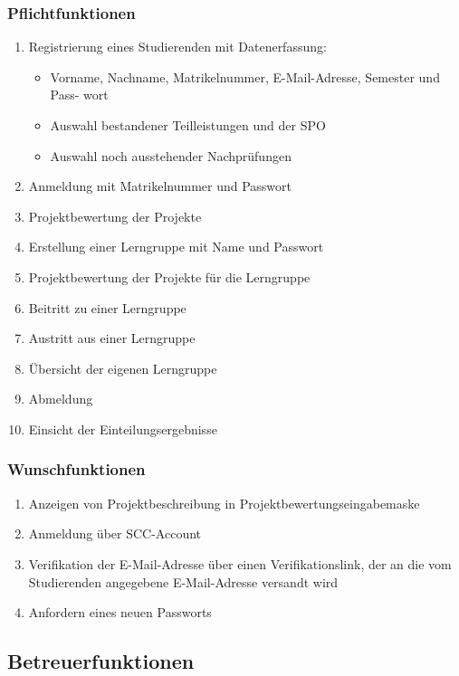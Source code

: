 \documentclass[parskip=full]{scrartcl}
\newcommand{\swtLabel}[1]{\textbf{/#1\arabic*0/}}
\begin{document}
\subsubsection{Pflichtfunktionen}
\begin{enumerate}[label=\swtLabel{FA}, resume]
  \item Registrierung eines Studierenden mit Datenerfassung:
  \begin{itemize}
    \item Vorname, Nachname, Matrikelnummer, E-Mail-Adresse, Semester und Pass-
wort
\item Auswahl bestandener Teilleistungen und der SPO
\item Auswahl noch ausstehender Nachprüfungen
  \end{itemize}
  \item Anmeldung mit Matrikelnummer und Passwort
  \item Projektbewertung der Projekte
  \item Erstellung einer Lerngruppe mit Name und Passwort
  \item Projektbewertung der Projekte für die Lerngruppe
  \item Beitritt zu einer Lerngruppe
  \item Austritt aus einer Lerngruppe
  \item Übersicht der eigenen Lerngruppe
  \item Abmeldung
  \item Einsicht der Einteilungsergebnisse
\end{enumerate}
\subsubsection{Wunschfunktionen}
\begin{enumerate}[label=\swtLabel{FA}, resume]
  \item Anzeigen von Projektbeschreibung in Projektbewertungseingabemaske
  \item Anmeldung über SCC-Account
  \item Verifikation der E-Mail-Adresse über einen Verifikationslink, der an die vom
Studierenden angegebene E-Mail-Adresse versandt wird
\item Anfordern eines neuen Passworts
\end{enumerate}

\subsection{Betreuerfunktionen}
\end{document}
